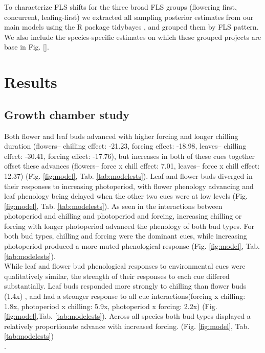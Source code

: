 \documentclass[11pt]{article}\usepackage[]{graphicx}\usepackage[]{color}
\begin{document}
\noindent To characterize FLS shifts for the three broad FLS groups (flowering first, concurrent, leafing-first) we extracted all sampling posterior estimates from our main models using the R package tidybayes \citep{Kay2020}, and grouped them by FLS pattern. We also include the species-specific estimates on which these grouped projects are base in Fig. \ref{}.  \\

\section*{Results} 
\subsection*{Growth chamber study} 
\noindent  Both flower and leaf buds advanced with higher forcing and longer chilling duration (flowers-- chilling effect: -21.23, forcing effect: -18.98, leaves-- chilling effect: -30.41, forcing effect: -17.76), but increases in both of these cues together offset these advances (flowers-- force x chill effect: 7.01, leaves-- force x chill effect: 12.37) (Fig. \ref{fig:model}, Tab. \ref{tab:modelests}). Leaf and flower buds diverged in their responses to increasing photoperiod, with flower phenology advancing and leaf phenology being delayed when the other two cues were at low levels (Fig. \ref{fig:model}, Tab. \ref{tab:modelests}). As seen in the interactions between photoperiod and chilling and photoperiod and forcing, increasing chilling or forcing with longer photoperiod advanced the phenology of both bud types. For both bud types, chilling and forcing were the dominant cues, while increasing photoperiod produced a more muted phenological response (Fig. \ref{fig:model}, Tab. \ref{tab:modelests}). \\

\noindent While leaf and flower bud phenological responses to environmental cues were qualitatively similar, the strength of their responses to each cue differed substantially. Leaf buds responded more strongly to chilling than flower buds (1.4x) , and had a stronger response to all cue interactions(forcing x chilling: 1.8x, photoperiod x chilling: 5.9x, photoperiod x forcing: 2.2x) (Fig. \ref{fig:model},Tab. \ref{tab:modelests}). Across all species both bud types displayed a relatively proportionate advance with increased forcing. (Fig. \ref{fig:model}, Tab. \ref{tab:modelests})\\.
\end{document}
